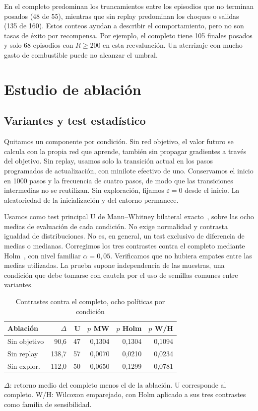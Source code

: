 \documentclass[conference]{IEEEtran}
\begin{document}
En el completo predominan los truncamientos entre los episodios que no terminan posados (48 de 55), mientras que sin replay predominan los choques o salidas (135 de 160). Estos conteos ayudan a describir el comportamiento, pero no son tasas de éxito por recompensa. Por ejemplo, el completo tiene 105 finales posados y solo 68 episodios con $R\geq200$ en esta reevaluación. Un aterrizaje con mucho gasto de combustible puede no alcanzar el umbral.

\section{Estudio de ablación}
\label{sec:ablacion}
\subsection{Variantes y test estadístico}
Quitamos un componente por condición. Sin red objetivo, el valor futuro se calcula con la propia red que aprende, también sin propagar gradientes a través del objetivo. Sin replay, usamos solo la transición actual en los pasos programados de actualización, con minilote efectivo de uno. Conservamos el inicio en 1000 pasos y la frecuencia de cuatro pasos, de modo que las transiciones intermedias no se reutilizan. Sin exploración, fijamos $\varepsilon=0$ desde el inicio. La aleatoriedad de la inicialización y del entorno permanece.

Usamos como test principal U de Mann--Whitney bilateral exacto~\cite{mann1947}, sobre las ocho medias de evaluación de cada condición. No exige normalidad y contrasta igualdad de distribuciones. No es, en general, un test exclusivo de diferencia de medias o medianas. Corregimos los tres contrastes contra el completo mediante Holm~\cite{holm1979}, con nivel familiar $\alpha=0{,}05$. Verificamos que no hubiera empates entre las medias utilizadas. La prueba supone independencia de las muestras, una condición que debe tomarse con cautela por el uso de semillas comunes entre variantes.

\begin{table}[t]
\caption{Contrastes contra el completo, ocho políticas por condición}
\label{tab:tests}
\centering
\begin{tabular}{@{}lrrrrr@{}}
\toprule
Ablación & $\Delta$ & U & $p$ MW & $p$ Holm & $p$ W/H \\
\midrule
Sin objetivo & 90,6 & 47 & 0,1304 & 0,1304 & 0,1094 \\
Sin replay & 138,7 & 57 & 0,0070 & 0,0210 & 0,0234 \\
Sin explor. & 112,0 & 50 & 0,0650 & 0,1299 & 0,0781 \\
\bottomrule
\end{tabular}
\smallskip
\parbox{\columnwidth}{\footnotesize $\Delta$: retorno medio del completo menos el de la ablación. U corresponde al completo. W/H: Wilcoxon emparejado, con Holm aplicado a sus tres contrastes como familia de sensibilidad.}
\end{table}
\end{document}
